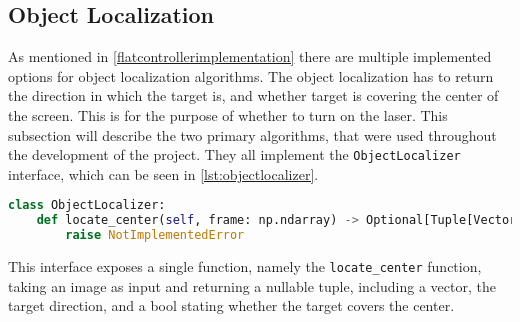 \subsection{Object Localization}\label{solution:ObjectLocalization}
As mentioned in \autoref{flatcontrollerimplementation} there are multiple implemented options for object localization algorithms.
The object localization has to return the direction in which the target is, and whether target is covering the center of the screen.
This is for the purpose of whether to turn on the laser.
This subsection will describe the two primary algorithms, that were used throughout the development of the project.
They all implement the \texttt{ObjectLocalizer} interface, which can be seen in \autoref{lst:objectlocalizer}.

\begin{lstlisting}[language=Python,label={lst:objectlocalizer},caption={The interface of all object localization algorithms}] 
class ObjectLocalizer:
	def locate_center(self, frame: np.ndarray) -> Optional[Tuple[Vector, bool]]:
		raise NotImplementedError
\end{lstlisting}
This interface exposes a single function, namely the \texttt{locate\_center} function, taking an image as input and returning a nullable tuple, including a vector, the target direction, and a bool stating whether the target covers the center.




